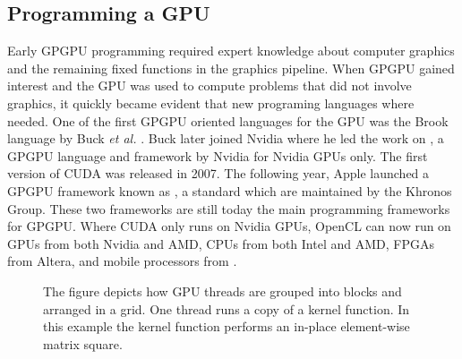 \subsection{Programming a GPU}
Early GPGPU programming required expert knowledge about computer graphics and the remaining fixed functions in the graphics pipeline. When GPGPU gained interest and the GPU was used to compute problems that did not involve graphics, it quickly became evident that new programing languages where needed.  One of the first GPGPU oriented languages for the GPU was the Brook language by Buck \textit{et al.} \cite{Buck2004}. Buck later joined Nvidia where he led the work on , a GPGPU language and framework by Nvidia for Nvidia GPUs only. The first version of CUDA was released in 2007. The following year, Apple launched a GPGPU framework known as , a standard which are maintained by the Khronos Group. These two frameworks are still today the main programming frameworks for GPGPU. Where CUDA only runs on Nvidia GPUs, OpenCL can now run on GPUs from both Nvidia and AMD, CPUs from both Intel and AMD, FPGAs from Altera, and mobile processors from .

\begin{figure}
\centering
{}
\caption{The figure depicts how GPU threads are grouped into blocks and arranged in a grid. One thread runs a copy of a kernel function. In this example the kernel function performs an in-place element-wise matrix square.}
\label{fig:gpu_grid_kernel}
\end{figure}

